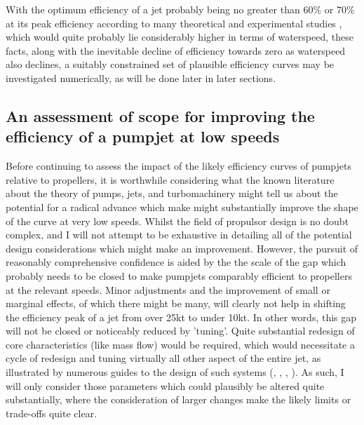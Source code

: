\documentclass{article}\usepackage[]{graphicx}\usepackage[]{color}
\begin{document}
With the optimum efficiency of a jet probably being no greater than 60\% or 70\% at its peak efficiency according to many theoretical and experimental studies \parencite{lu2016cfd}, which would quite probably lie considerably higher in terms of waterspeed, these facts, along with the inevitable decline of efficiency towards zero as waterspeed also declines, a suitably constrained set of plausible efficiency curves may be investigated numerically, as will be done later in later sections.

\subsection{An assessment of scope for improving the efficiency of a pumpjet at low speeds}
Before continuing to assess the impact of the likely efficiency curves of pumpjets relative to propellers, it is worthwhile considering what the known literature about the theory of pumps, jets, and turbomachinery might tell us about the potential for a radical advance which make might substantially improve the shape of the curve at very low speeds.  Whilst the field of propulsor design is no doubt complex, and I will not attempt to be exhaustive in detailing all of the potential design considerations which might make an improvement.  However, the pursuit of reasonably comprehensive confidence is aided by the the scale of the gap which probably needs to be closed to make pumpjets comparably efficient to propellers at the relevant speeds.  Minor adjustments and the improvement of small or marginal effects, of which there might be many, will clearly not help in shifting the efficiency peak of a jet from over 25kt to under 10kt.  In other words, this gap will not be closed or noticeably reduced by 'tuning'.  Quite substantial redesign of core characteristics (like mass flow) would be required, which would necessitate a cycle of redesign and tuning virtually all other aspect of the entire jet, as illustrated by numerous guides to the design of such systems (\cite{bruce1974}, \cite{furuya1988}, \cite{mccormick1963design}, \cite{henderson1964}).  As such, I will only consider those parameters which could plausibly be altered quite substantially, where the consideration of larger changes make the likely limits or trade-offs quite clear.
\end{document}
